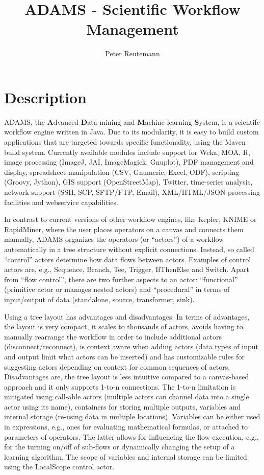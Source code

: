 \documentclass[a4paper,10pt]{article}
\title{ADAMS - Scientific Workflow Management}
\author{Peter Reutemann}
\begin{document}
\maketitle

\section{Description}
ADAMS, the \textbf{A}dvanced \textbf{D}ata mining and \textbf{M}achine learning \textbf{S}ystem, is a scientifc workflow engine written in Java. Due to its modularity, it is easy to build custom applications that are targeted towards specific functionality, using the Maven build system. Currently available modules include support for Weka, MOA, R, image processing (ImageJ, JAI, ImageMagick, Gnuplot), PDF management and display, spreadsheet manipulation (CSV, Gnumeric, Excel, ODF), scripting (Groovy, Jython), GIS support (OpenStreetMap), Twitter, time-series analysis, network support (SSH, SCP, SFTP/FTP, Email), XML/HTML/JSON processing facilities and webservice capabilities.

In contrast to current versions of other workflow engines, like Kepler, KNIME or RapidMiner, where the user places operators on a canvas and connects them manually, ADAMS organizes the operators (or ``actors'') of a workflow automatically in a tree structure without explicit connections. Instead, so called ``control'' actors determine how data flows between actors. Examples of control actors are, e.g., Sequence, Branch, Tee, Trigger, IfThenElse and Switch. Apart from ``flow control'', there are two further aspects to an actor: ``functional'' (primitive actor or manages nested actors) and ``procedural'' in terms of input/output of data (standalone, source, transformer, sink).

Using a tree layout has advantages and disadvantages. In terms of advantages, the layout is very compact, it scales to thousands of actors, avoids having to manually rearrange the workflow in order to include additional actors (disconnect/reconnect), is context aware when adding actors (data types of input and output limit what actors can be inserted) and has customizable rules for suggesting actors depending on context for common sequences of actors. Disadvantages are, the tree layout is less intuitive compared to a canvas-based approach and it only supports 1-to-n connections. The 1-to-n limitation is mitigated using call-able actors (multiple actors can channel data into a single actor using its name), containers for storing multiple outputs, variables and internal storage (re-using data in multiple locations). Variables can be either used in expressions, e.g., ones for evaluating mathematical formulas, or attached to parameters of operators. The latter allows for influencing the flow execution, e.g., for 
the turning on/off of sub-flows or dynamically changing the setup of a learning algorithm. The scope of variables and internal storage can be limited using the LocalScope control actor.
\end{document}
